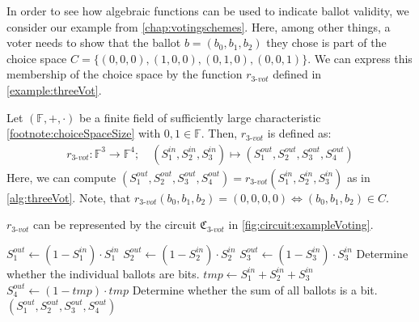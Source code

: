 In order to see how algebraic functions can be used to indicate ballot validity, we consider our example from \cref{chap:votingschemes}.
Here, among other things, a voter needs to show that the ballot $b=(b_0,b_1,b_2)$ they chose is part of the choice space $C=\{(0,0,0),(1,0,0), (0,1,0), (0,0,1)\}$.
We can express this membership of the choice space by the function $r_{3\text{-}vot}$ defined in \cref{example:threeVot}.
\begin{example}
    \label{example:threeVot}
    Let $(\mathbb{F},+,\cdot)$ be a finite field of sufficiently large characteristic \cref{footnote:choiceSpaceSize} with $0,1\in\mathbb{F}$.
    Then, $r_{3\text{-}vot}$ is defined as:
    \begin{align*}
        r_{3\text{-}vot}:\mathbb{F}^3\to\mathbb{F}^4;\quad(S_1^{in},S_2^{in}, S_3^{in})\mapsto (S_1^{out}, S_2^{out}, S_3^{out}, S_4^{out})
    \end{align*}
    Here, we can compute $(S_1^{out}, S_2^{out}, S_3^{out}, S_4^{out})=r_{3\text{-}vot}(S_1^{in},S_2^{in}, S_3^{in})$ as in \cref{alg:threeVot}.
    Note, that $r_{3\text{-}vot}(b_0,b_1,b_2)=(0,0,0,0)\Leftrightarrow (b_0,b_1,b_2)\in C$.

    $r_{3\text{-}vot}$ can be represented by the circuit $\mathfrak{C}_{3\text{-}vot}$ in \cref{fig:circuit:exampleVoting}.
\end{example}

\begin{Algorithmus}[h] %
    \caption{Function $r_{3\text{-}vot}$ used to check whether a ballot $b=(b_0,b_1,b_2)=(S_1^{in}, S_2^{in}, S_3^{in})$ is in the choice space $C=\{(0,0,0),(1,0,0),(0,1,0),(0,0,1)\}$. 
    $r_{3\text{-}vot}$ returns $(0,0,0,0)$ if this is the case and something else otherwise.}
    \label{alg:threeVot}
    \begin{algorithmic}
        \State $S_1^{out}\gets (1-S_1^{in})\cdot S_1^{in}$
        \State $S_2^{out}\gets (1-S_2^{in})\cdot S_2^{in}$
        \State $S_3^{out}\gets (1-S_3^{in})\cdot S_3^{in}$ \Comment Determine whether the individual ballots are bits.
        \State $tmp\gets S_1^{in}+S_2^{in}+S_3^{in}$
        \State $S_4^{out}\gets (1-tmp)\cdot tmp$ \Comment Determine whether the sum of all ballots is a bit.
        \State \Return $(S_1^{out}, S_2^{out}, S_3^{out}, S_4^{out})$
    \EndProcedure
    \end{algorithmic}
\end{Algorithmus}

